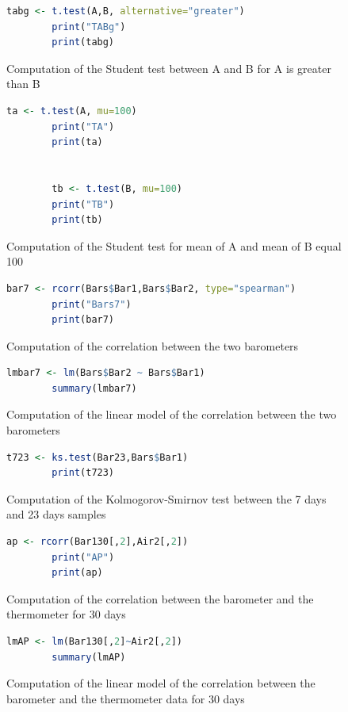 \documentclass[12pt,a4paper]{article}
\begin{document}
\begin{figure}[ht]
    \begin{lstlisting}[language=R]
        tabg <- t.test(A,B, alternative="greater")
        print("TABg")
        print(tabg)
    \end{lstlisting}
    \caption{Computation of the Student test between A and B for A is greater than B}
    \label{ttestA>B}
\end{figure}

\begin{figure}[ht]
    \begin{lstlisting}[language=R]
        ta <- t.test(A, mu=100)
        print("TA")
        print(ta)


        tb <- t.test(B, mu=100)
        print("TB")
        print(tb)
    \end{lstlisting}
    \caption{Computation of the Student test for mean of A and mean of B equal 100}
    \label{ttest100}
\end{figure}

\begin{figure}[ht]
    \begin{lstlisting}[language=R]
        bar7 <- rcorr(Bars$Bar1,Bars$Bar2, type="spearman")
        print("Bars7")
        print(bar7)
    \end{lstlisting}
    \caption{Computation of the correlation between the two barometers}
    \label{corbars}
\end{figure}

\begin{figure}[ht]
    \begin{lstlisting}[language=R]
        lmbar7 <- lm(Bars$Bar2 ~ Bars$Bar1)
        summary(lmbar7)
    \end{lstlisting}
    \caption{Computation of the linear model of the correlation between the two barometers}
    \label{lmbar7}
\end{figure}

\begin{figure}[ht]
    \begin{lstlisting}[language=R]
        t723 <- ks.test(Bar23,Bars$Bar1)
        print(t723)
    \end{lstlisting}
    \caption{Computation of the Kolmogorov-Smirnov test between the 7 days and 23 days samples}
    \label{smir}
\end{figure}

\begin{figure}[ht]
    \begin{lstlisting}[language=R]
        ap <- rcorr(Bar130[,2],Air2[,2])
        print("AP")
        print(ap)
    \end{lstlisting}
    \caption{Computation of the correlation between the barometer and the thermometer for 30 days}
    \label{corAP}
\end{figure}

\begin{figure}[ht]
    \begin{lstlisting}[language=R]
        lmAP <- lm(Bar130[,2]~Air2[,2])
        summary(lmAP)
    \end{lstlisting}
    \caption{Computation of the linear model of the correlation between the barometer and the thermometer data for 30 days}
    \label{lmAP}
\end{figure}
\end{document}

